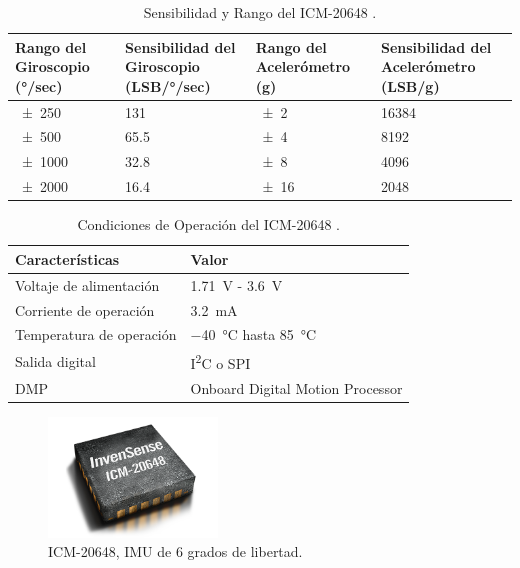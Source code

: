 \bgroup
\def\arraystretch{1.5}%
\begin{table}[htbp!]
\centering
\caption[Sensibilidad y Rango del ICM-20648]{Sensibilidad y Rango del ICM-20648 \cite{ICM20648}.}
\begin{tabular}{@{}P{3cm}P{3cm}P{3cm}P{3cm}@{}}
\toprule
Rango del Giroscopio (\si{\degree/sec}) & Sensibilidad del Giroscopio (\si{LSB/\degree/sec}) & Rango del Acelerómetro     (\si{g}) & Sensibilidad del Acelerómetro (\si{LSB/g}) \\ \midrule
\num{\pm 250} & 131 & \num{\pm 2} & 16384 \\
\num{\pm 500} & 65.5 & \num{\pm 4} & 8192 \\
\num{\pm 1000} & 32.8 & \num{\pm 8} & 4096 \\
\num{\pm 2000} & 16.4 & \num{\pm 16} & 2048 \\ \bottomrule
\end{tabular}
\label{diag:IMU1}
\end{table}

\begin{table}[htbp!]
\centering
\caption[Condiciones de Operación del ICM-20648]{Condiciones de Operación del ICM-20648 \cite{ICM20648}.}
\begin{tabular}{@{}ll@{}}
\toprule
Características & Valor \\ \midrule
Voltaje de alimentación & \SI{1.71}{V} - \SI{3.6}{V} \\
Corriente de operación & \SI{3.2}{mA} \\
Temperatura de operación & \SI{-40}{\celsius} hasta \SI{85}{\celsius} \\
Salida digital & I\textsuperscript{2}C o SPI \\
DMP & Onboard Digital Motion Processor \\ \bottomrule
\end{tabular}
\label{diag:IMU2}
\end{table}

\egroup

\begin{figure}[htbp!]
\centering
\includegraphics[width=0.4\textwidth]{ICM-20648.png}
\caption{ICM-20648, IMU de 6 grados de libertad.}
\label{fig:IMU}
\end{figure}



